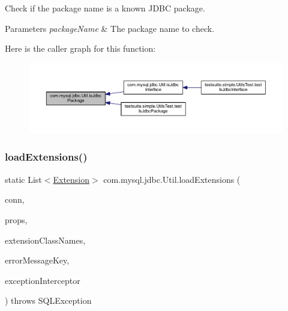 Check if the package name is a known J\+D\+BC package.


\begin{DoxyParams}{Parameters}
{\em package\+Name} & The package name to check. \\
\hline
\end{DoxyParams}
Here is the caller graph for this function\+:
\nopagebreak
\begin{figure}[H]
\begin{center}
\leavevmode
\includegraphics[width=350pt]{classcom_1_1mysql_1_1jdbc_1_1_util_a9cb2ac4a8521a60214e3186ad634b3b3_icgraph}
\end{center}
\end{figure}
\mbox{\label{classcom_1_1mysql_1_1jdbc_1_1_util_a7437eb4eaa7c101657b58d764e825f62}} 
\subsubsection{\texorpdfstring{load\+Extensions()}{loadExtensions()}}
{\footnotesize\ttfamily static List$<$\mbox{\hyperlink{interfacecom_1_1mysql_1_1jdbc_1_1_extension}{Extension}}$>$ com.\+mysql.\+jdbc.\+Util.\+load\+Extensions (\begin{DoxyParamCaption}\item[{\mbox{\hyperlink{interfacecom_1_1mysql_1_1jdbc_1_1_connection}{Connection}}}]{conn,  }\item[{Properties}]{props,  }\item[{String}]{extension\+Class\+Names,  }\item[{String}]{error\+Message\+Key,  }\item[{\mbox{\hyperlink{interfacecom_1_1mysql_1_1jdbc_1_1_exception_interceptor}{Exception\+Interceptor}}}]{exception\+Interceptor }\end{DoxyParamCaption}) throws S\+Q\+L\+Exception\hspace{0.3cm}{\ttfamily [static]}}

